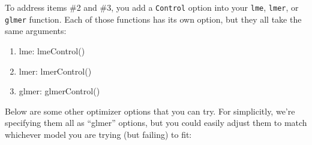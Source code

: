 \documentclass[
  letterpaper,
  DIV=11,
  numbers=noendperiod]{scrreprt}
\begin{document}
To address items \#2 and \#3, you add a \texttt{Control} option into
your \texttt{lme}, \texttt{lmer}, or \texttt{glmer} function. Each of
those functions has its own option, but they all take the same
arguments:

\begin{enumerate}
  \item lme: lmeControl()
  \item lmer: lmerControl()
  \item glmer: glmerControl()
\end{enumerate}

Below are some other optimizer options that you can try. For
simplicitly, we're specifying them all as ``glmer'' options, but you
could easily adjust them to match whichever model you are trying (but
failing) to fit:
\end{document}
